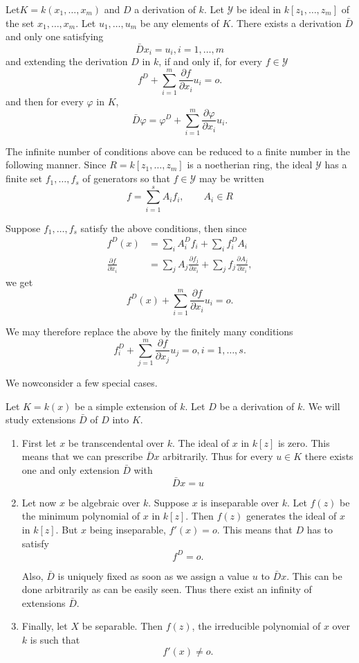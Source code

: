 \begin{thm}\label{c3:thm6}%
Let\pageoriginale $K=k(x_1, \ldots,x_m)$ and $D$ a derivation of $k$. Let
  $\mathscr{Y}$ be ideal in $k[z_1, \ldots,z_m]$ of the set $x_1,
  \ldots,x_m$. Let $u_1, \ldots,u_m$ be any elements of $K$. There
  exists a derivation $\bar{D}$ and only one satisfying   
$$
\bar{D}x_i = u_i,  i= 1, \ldots, m 
$$
and extending the derivation $D$ in $k$, if and only if, for every $f
\in \mathscr{Y}$ 
$$
f^D + \sum^m_{i=1} \frac{\partial f}{\partial x_i}u_i =  o.
$$
and then for every $\varphi$ in $K$,
$$
\bar{D} \varphi = \varphi^D + \sum^m_{i=1} \frac{\partial
  \varphi}{\partial x_i}u_i. 
$$
\end{thm} 

The infinite number of conditions above can be reduced to a finite
number in the following manner. Since $R=k[z_1, \ldots , z_m]$
is a noetherian ring, the ideal $\mathscr{Y}$ has a finite set $f_1,
\ldots , f_s$ of generators so that $f \in \mathscr{Y}$ may be written  
$$
f = \sum^s_{i=1} A_i f_i, \qquad A_i \in R
$$

Suppose $f_1, \ldots , f_s$ satisfy the above conditions, then since  
\begin{align*}
f^D(x) & = \sum_i A^D_i f_i + \sum_i f^D_i A_i \\
\frac{\partial f}{\partial x_i} & = \sum_j A_j \frac{\partial
  f_j}{\partial x_i}+ \sum_j f_j \frac{\partial A_j}{\partial x_i}, 
\end{align*}
we get 
$$
f^D(x) + \sum^m_{i=1} \frac{\partial f}{\partial x_i}u_i = o. 
$$

We may therefore replace the above by the finitely many conditions  
$$
f^D_i + \sum^m_{j=1} \frac{\partial f}{\partial x_j} u_j= o , i= 1,
\ldots,s. 
$$

We now\pageoriginale consider a few special cases.

Let $K=k(x)$ be a simple extension of $k$. Let $D$ be a derivation of
$k$. 	We will study extensions $\bar{D}$ of $D$ into $K$. 
\begin{enumerate}
\renewcommand{\labelenumi}{(\theenumi)}
\item First let $x$ be transcendental over $k$. The ideal of $x$ in $k
  [z]$ is zero. This means that we can prescribe $\bar{D}x$
  arbitrarily. Thus for every $u \in K$ there exists one and only
  extension $\bar{D}$ with  
$$
\bar{D}x = u
$$

\item Let now $x$ be algebraic over $k$. Suppose $x$ is inseparable over
  $k$. Let $f(z)$ be the minimum polynomial of $x$ in $k[z]$. Then
  $f(z)$ generates the ideal of $x$ in $k[z]$. But $x$ being
  inseparable, $f'(x)=o$. This means that $D$ has to satisfy  
$$
f^D=o.
$$

Also, $\bar{D}$ is uniquely fixed as soon as we assign a value $u$ to
$\bar{D}x$. This can be done arbitrarily as can be easily seen. Thus
there exist an infinity of extensions $\bar{D}$. 

\item Finally, let $X$ be separable. Then $f(z)$, the irreducible
  polynomial of $x$ over $k$ is such that  
$$
f'(x) \neq o.
$$
\end{enumerate}

